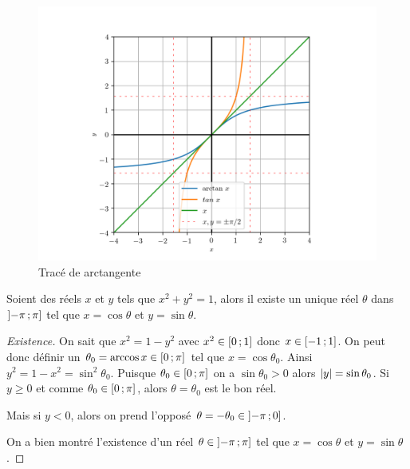 \begin{figure}
  \centering
  \includegraphics[scale=0.6]{arctan.png}
  \caption{Tracé de arctangente}
  \label{fig:tracearctangente}
\end{figure}
%
\begin{theo}
  \label{chap1-theo:thetasin}
  Soient des réels \(x\) et \(y\) tels que \(x^2+y^2=1\), alors il existe un unique réel \(\theta\) dans \(\left] -\pi \, ;  \pi \right]\) tel que \(x=\cos \theta\) et \(y=\sin \theta\).
\end{theo}
\begin{proof}[Existence]
  On sait que \(x^2=1-y^2\) avec \(x^2 \in \left[ 0 \, ;  1 \right]\) donc \(x \in \left[ -1 \, ;  1 \right]\). On peut donc définir un \(\theta_0=\arccos x \in \left[ 0 \, ;  \pi \right]\) tel que \(x=\cos \theta_0\). Ainsi \(y^2=1-x^2=\sin^2 \theta_0\). Puisque \(\theta_0 \in \left[ 0 \, ;  \pi \right]\) on a \(\sin \theta_0>0\) alors \(\left\lvert y\right\rvert=\sin \theta_0\).
Si \(y \geqslant 0\) et comme \(\theta_0 \in \left[ 0 \, ;  \pi \right]\), alors \(\theta=\theta_0\) est le bon réel.

Mais si \(y<0\), alors on prend l'opposé \(\theta=-\theta_0 \in \left] -\pi \, ;  0 \right]\).

On a bien montré l'existence d'un réel \(\theta \in \left] -\pi \, ;  \pi \right]\) tel que \(x=\cos \theta\) et \(y=\sin \theta\).
\end{proof}
